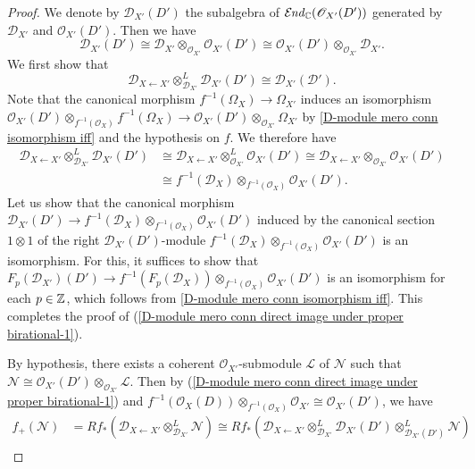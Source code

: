 \begin{proof}
We denote by $\mathscr{D}_{X'}(D')$ the subalgebra of $\operatorname{\mathcal{E}\hspace*{-1pt}\textit{nd}\hspace{0.5pt}}_{\mathbb{C}}(\mathscr{O}_{X'}(D'))$ generated by $\mathscr{D}_{X'}$ and $\mathscr{O}_{X'}(D')$. Then we have
\[\mathscr{D}_{X'}(D')\cong\mathscr{D}_{X'}\otimes_{\mathscr{O}_{X'}}\mathscr{O}_{X'}(D')\cong\mathscr{O}_{X'}(D')\otimes_{\mathscr{O}_{X'}}\mathscr{D}_{X'}.\]
We first show that
\begin{equation}\label{D-module mero conn direct image under proper birational-1}
\mathscr{D}_{X\leftarrow X'}\otimes_{\mathscr{D}_{X'}}^L\mathscr{D}_{X'}(D')\cong\mathscr{D}_{X'}(\mathscr{D}').
\end{equation}
Note that the canonical morphism $f^{-1}(\Omega_X)\to\Omega_{X'}$ induces an isomorphism $\mathscr{O}_{X'}(D')\otimes_{f^{-1}(\mathscr{O}_X)}f^{-1}(\Omega_X)\to\mathscr{O}_{X'}(D')\otimes_{\mathscr{O}_{X'}}\Omega_{X'}$ by \cref{D-module mero conn isomorphism iff} and the hypothesis on $f$. We therefore have
\begin{align*}
\mathscr{D}_{X\leftarrow X'}\otimes_{\mathscr{D}_{X'}}^L\mathscr{D}_{X'}(D')&\cong \mathscr{D}_{X\leftarrow X'}\otimes_{\mathscr{O}_{X'}}^L\mathscr{O}_{X'}(D')\cong\mathscr{D}_{X\leftarrow X'}\otimes_{\mathscr{O}_{X'}}\mathscr{O}_{X'}(D')\\
&\cong f^{-1}(\mathscr{D}_X)\otimes_{f^{-1}(\mathscr{O}_X)}\mathscr{O}_{X'}(D').
\end{align*}
Let us show that the canonical morphism $\mathscr{D}_{X'}(D')\to f^{-1}(\mathscr{D}_X)\otimes_{f^{-1}(\mathscr{O}_X)}\mathscr{O}_{X'}(D')$ induced by the canonical section $1\otimes 1$ of the right $\mathscr{D}_{X'}(D')$-module $f^{-1}(\mathscr{D}_X)\otimes_{f^{-1}(\mathscr{O}_X)}\mathscr{O}_{X'}(D')$ is an isomorphism. For this, it suffices to show that $F_p(\mathscr{D}_{X'})(D')\to f^{-1}(F_p(\mathscr{D}_X))\otimes_{f^{-1}(\mathscr{O}_X)}\mathscr{O}_{X'}(D')$ is an isomorphism for each $p\in\mathbb{Z}$, which follows from \cref{D-module mero conn isomorphism iff}. This completes the proof of (\ref{D-module mero conn direct image under proper birational-1}).\par
By hypothesis, there exists a coherent $\mathscr{O}_{X'}$-submodule $\mathscr{L}$ of $\mathscr{N}$ such that $\mathscr{N}\cong\mathscr{O}_{X'}(D')\otimes_{\mathscr{O}_{X'}}\mathscr{L}$. Then by (\ref{D-module mero conn direct image under proper birational-1}) and $f^{-1}(\mathscr{O}_X(D))\otimes_{f^{-1}(\mathscr{O}_X)}\mathscr{O}_{X'}\cong\mathscr{O}_{X'}(D')$, we have
\begin{align*}
f_+(\mathscr{N})&=Rf_*(\mathscr{D}_{X\leftarrow X'}\otimes_{\mathscr{D}_{X'}}^L\mathscr{N})\cong Rf_*(\mathscr{D}_{X\leftarrow X'}\otimes_{\mathscr{D}_{X'}}^L\mathscr{D}_{X'}(D')\otimes_{\mathscr{D}_{X'}(D')}^L\mathscr{N})\\

\end{align*}
\end{proof}
